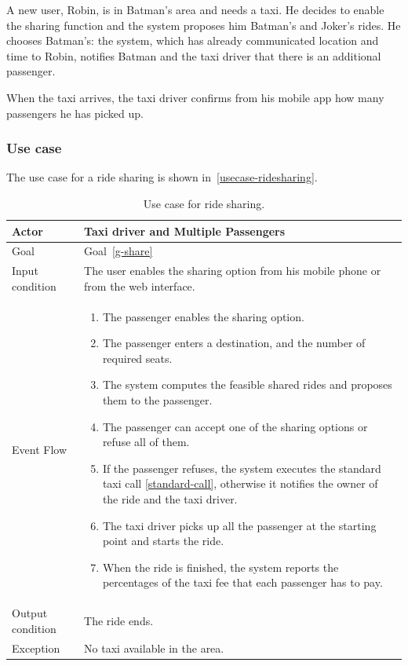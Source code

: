 A new user, Robin, is in Batman's area and needs a taxi. He decides to enable the sharing function and the system proposes him Batman's and Joker's rides.
He chooses Batman's: the system, which has already communicated location and time to Robin, notifies Batman and the taxi driver that there is an additional passenger.

When the taxi arrives, the taxi driver confirms from his mobile app how many passengers he has picked up.

\subsubsection{Use case}
The use case for a ride sharing is shown in~\autoref{usecase-ridesharing}.

\begin{table}
\begin{center}
\begin{tabular}{| l | p{} |}
\hline
Actor & Taxi driver and Multiple Passengers \\
\hline
Goal & Goal~\ref{g-share}
\\
\hline
Input condition & The user enables the sharing option from his mobile phone or from the web interface.  \\
\hline
Event Flow &
\begin{enumerate}
	\item The passenger enables the sharing option.
	\item The passenger enters a destination, and the number of required seats.
	\item The system computes the feasible shared rides and proposes them to the passenger.
	\item The passenger can accept one of the sharing options or refuse all of them.
	\item If the passenger refuses, the system executes the standard taxi call \ref{standard-call}, otherwise it notifies the owner of the ride and the taxi driver.
	\item The taxi driver picks up all the passenger at the starting point and starts the ride.
	\item When the ride is finished, the system reports the percentages of the taxi fee that each passenger has to pay.
\end{enumerate}
\\
\hline
Output condition & The ride ends. \\
\hline
Exception & No taxi available in the area. \\
\hline
\end{tabular}
\end{center}
\caption{Use case for ride sharing.}
\label{usecase-ridesharing}
\end{table}

